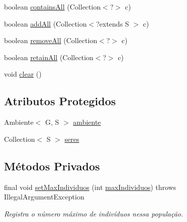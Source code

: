 \begin{DoxyCompactItemize}
\item 
boolean \hyperlink{classic_1_1populacional_1_1_populacao_3_01_gextends_01_number_01_6_comparable_3_01_g_01_4_00_01_439c3806f66bccf03e2d51ecb538a0c8_a3914a7c7e2bf978f4fdd03d327911974}{contains\-All} (Collection$<$?$>$ c)
\item 
boolean \hyperlink{classic_1_1populacional_1_1_populacao_3_01_gextends_01_number_01_6_comparable_3_01_g_01_4_00_01_439c3806f66bccf03e2d51ecb538a0c8_ae33b527a5aa74b03730bef0bcf0dffb5}{add\-All} (Collection$<$?extends S $>$ c)
\item 
boolean \hyperlink{classic_1_1populacional_1_1_populacao_3_01_gextends_01_number_01_6_comparable_3_01_g_01_4_00_01_439c3806f66bccf03e2d51ecb538a0c8_ac89a7a7d95162dccfaea6e7e6d3e278a}{remove\-All} (Collection$<$?$>$ c)
\item 
boolean \hyperlink{classic_1_1populacional_1_1_populacao_3_01_gextends_01_number_01_6_comparable_3_01_g_01_4_00_01_439c3806f66bccf03e2d51ecb538a0c8_a61b97284f3b56652acb34105cfc5d2ce}{retain\-All} (Collection$<$?$>$ c)
\item 
void \hyperlink{classic_1_1populacional_1_1_populacao_3_01_gextends_01_number_01_6_comparable_3_01_g_01_4_00_01_439c3806f66bccf03e2d51ecb538a0c8_a64fb082a3ec59eec55c24880a26b87c6}{clear} ()
\end{DoxyCompactItemize}
\subsection*{Atributos Protegidos}
\begin{DoxyCompactItemize}
\item 
Ambiente$<$ G, S $>$ \hyperlink{classic_1_1populacional_1_1_populacao_3_01_gextends_01_number_01_6_comparable_3_01_g_01_4_00_01_439c3806f66bccf03e2d51ecb538a0c8_a4dd149003426cf930609484556919a72}{ambiente}
\item 
Collection$<$ S $>$ \hyperlink{classic_1_1populacional_1_1_populacao_3_01_gextends_01_number_01_6_comparable_3_01_g_01_4_00_01_439c3806f66bccf03e2d51ecb538a0c8_a22fc0aa8b35d6a308cce0a87130cb9b0}{seres}
\end{DoxyCompactItemize}
\subsection*{Métodos Privados}
\begin{DoxyCompactItemize}
\item 
final void \hyperlink{classic_1_1populacional_1_1_populacao_3_01_gextends_01_number_01_6_comparable_3_01_g_01_4_00_01_439c3806f66bccf03e2d51ecb538a0c8_a2723175279b08f22c0e0245210857320}{set\-Max\-Individuos} (int \hyperlink{classic_1_1populacional_1_1_populacao_3_01_gextends_01_number_01_6_comparable_3_01_g_01_4_00_01_439c3806f66bccf03e2d51ecb538a0c8_afe0e065f83c9113fbfdc520d0ca28eac}{max\-Individuos})  throws Illegal\-Argument\-Exception 
\begin{DoxyCompactList}\small\item\em Registra o número máximo de indivíduos nessa população. \end{DoxyCompactList}\end{DoxyCompactItemize}
